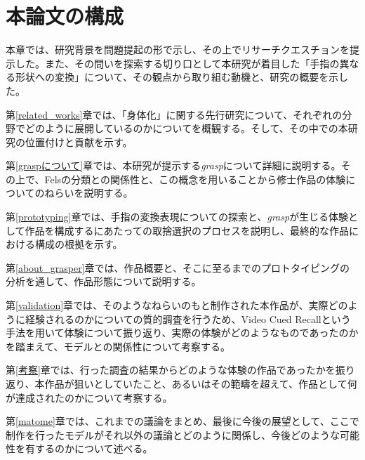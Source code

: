 \section{本論文の構成}
本章では、研究背景を問題提起の形で示し、その上でリサーチクエスチョンを提示した。また、その問いを探索する切り口として本研究が着目した「手指の異なる形状への変換」について、その観点から取り組む動機と、研究の概要を示した。

第\ref{related_works}章では、「身体化」に関する先行研究について、それぞれの分野でどのように展開しているのかについてを概観する。そして、その中での本研究の位置付けと貢献を示す。

第\ref{graspについて}章では、本研究が提示する\textit{grasp}について詳細に説明する。その上で、Felsの分類との関係性と、この概念を用いることから修士作品の体験についてのねらいを説明する。

第\ref{prototyping}章では、手指の変換表現についての探索と、\textit{grasp}が生じる体験として作品を構成するにあたっての取捨選択のプロセスを説明し、最終的な作品における構成の根拠を示す。

第\ref{about_grasper}章では、作品概要と、そこに至るまでのプロトタイピングの分析を通して、作品形態について説明する。

第\ref{validation}章では、そのようなねらいのもと制作された本作品が、実際どのように経験されるのかについての質的調査を行うため、Video Cued Recallという手法を用いて体験について振り返り、実際の体験がどのようなものであったのかを踏まえて、モデルとの関係性について考察する。

第\ref{考察}章では、行った調査の結果からどのような体験の作品であったかを振り返り、本作品が狙いとしていたこと、あるいはその範疇を超えて、作品として何が達成されたのかについて考察する。

第\ref{matome}章では、これまでの議論をまとめ、最後に今後の展望として、ここで制作を行ったモデルがそれ以外の議論とどのように関係し、今後どのような可能性を有するのかについて述べる。